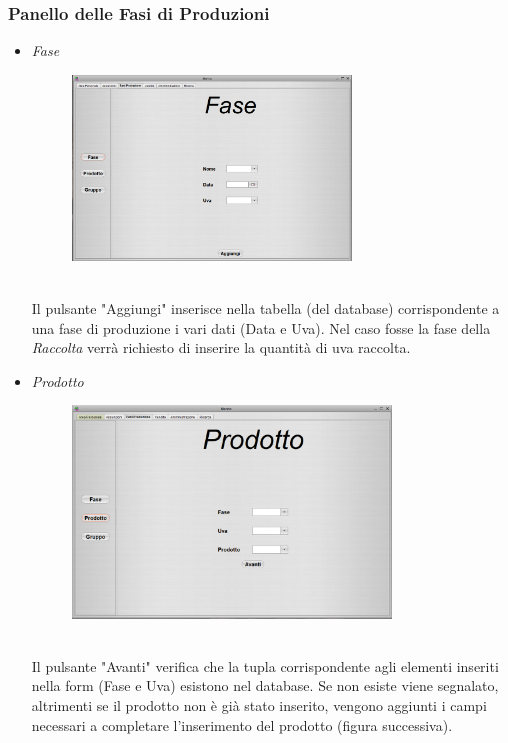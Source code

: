 \documentclass{article}
\begin{document}
\subsubsection{Panello delle Fasi di Produzioni}
\begin{itemize}
\item \textit{Fase}\\
\begin{figure}[htbp]
\centering
\includegraphics[width=0.7\textwidth]{img/panel_phase.png}
\end{figure}\\
Il pulsante "Aggiungi" inserisce nella tabella (del database) corrispondente a una fase di produzione i vari dati (Data e Uva). Nel caso fosse la fase della \textit{Raccolta} verrà richiesto di inserire la quantità di uva raccolta.\\
\newpage
\item \textit{Prodotto}\\
\begin{figure}[htbp]
\centering
\includegraphics[width=0.8\textwidth]{img/panel_product.png}
\end{figure}\\
Il pulsante "Avanti" verifica che la tupla corrispondente agli elementi inseriti nella form (Fase e Uva) esistono nel database. Se non esiste viene segnalato, altrimenti se il prodotto non è già stato inserito, vengono aggiunti i campi necessari a completare l'inserimento del prodotto (figura successiva).

\end{itemize}
\end{document}

